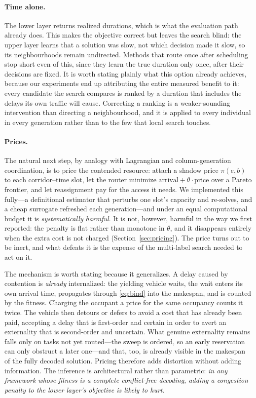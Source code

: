 \documentclass[manuscript,screen,review]{acmart}
\begin{document}
\paragraph{Time alone.}
The lower layer returns realized durations, which is what the evaluation path
already does. This makes the objective correct but leaves the search blind: the
upper layer learns that a solution was slow, not which decision made it slow, so
its neighbourhoods remain undirected. Methods that route once after scheduling
stop short even of this, since they learn the true duration only once, after
their decisions are fixed. It is worth stating plainly what this option already
achieves, because our experiments end up attributing the entire measured benefit
to it: every candidate the search compares is ranked by a duration that includes
the delays its own traffic will cause. Correcting a ranking is a weaker-sounding
intervention than directing a neighbourhood, and it is applied to every
individual in every generation rather than to the few that local search touches.

\paragraph{Prices.}
The natural next step, by analogy with Lagrangian and column-generation
coordination, is to price the contended resource: attach a shadow price
$\pi(e,b)$ to each corridor--time slot, let the router minimize
$\text{arrival}+\theta\cdot\text{price}$ over a Pareto frontier, and let
reassignment pay for the access it needs. We implemented this fully---a
definitional estimator that perturbs one slot's capacity and re-solves, and a
cheap surrogate refreshed each generation---and under an equal computational
budget it is \emph{systematically harmful}. It is not, however, harmful in the
way we first reported: the penalty is flat rather than monotone in $\theta$, and
it disappears entirely when the extra cost is not charged
(Section~\ref{sec:pricing}). The price turns out to be inert, and what defeats it
is the expense of the multi-label search needed to act on it.

The mechanism is worth stating because it generalizes. A delay caused by
contention is \emph{already} internalized: the yielding vehicle waits, the wait
enters its own arrival time, propagates through \eqref{eq:bind} into the
makespan, and is counted by the fitness. Charging the occupant a price for the
same occupancy counts it twice. The vehicle then detours or defers to avoid a
cost that has already been paid, accepting a delay that is first-order and
certain in order to avert an externality that is second-order and uncertain.
What genuine externality remains falls only on tasks not yet routed---the sweep
is ordered, so an early reservation can only obstruct a later one---and that,
too, is already visible in the makespan of the fully decoded solution. Pricing
therefore adds distortion without adding information. The inference is
architectural rather than parametric: \emph{in any framework whose fitness is a
complete conflict-free decoding, adding a congestion penalty to the lower
layer's objective is likely to hurt.}
\end{document}
